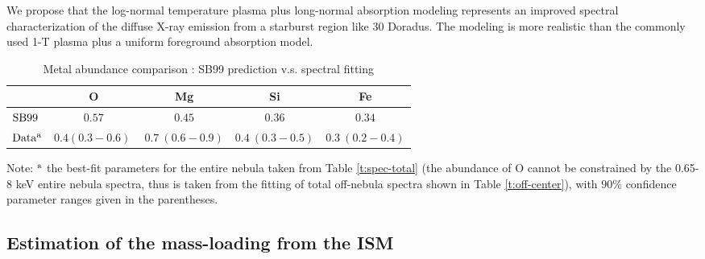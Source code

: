 \documentclass[usenatbib]{mnras}
\def\xs{30 Doradus}
\begin{document}
We propose that the log-normal temperature plasma plus long-normal absorption modeling represents an improved spectral characterization of the diffuse X-ray emission from a starburst region like \xs. The modeling is more realistic than the commonly used 1-T plasma plus a uniform foreground absorption model.

\begin{table*}%
\caption{Metal abundance comparison : SB99 prediction v.s. spectral fitting}
\begin{tabular}{lcccc}
\hline
 & O & Mg & Si & Fe \\
\hline
${\rm SB99}$ & $0.57$ & $0.45$ & $0.36$ & $0.34$\\

${\rm Data^{\rm a}}$ & $0.4(0.3-0.6)\ $ & $0.7\ (0.6-0.9)$ & $0.4\ (0.3-0.5)$ & $0.3\ (0.2-0.4)$\\
\hline
\end{tabular}
\label{t:abundance}

Note:  ${}^{\rm a}$ the best-fit parameters for the entire nebula taken from Table \ref{t:spec-total} (the abundance of O cannot be constrained by the 0.65-8 keV entire nebula spectra, thus is taken from the fitting of total off-nebula spectra shown in Table \ref{t:off-center}), with $90\%$ confidence parameter ranges given in the parentheses. 
\end{table*}

\subsection{Estimation of the mass-loading from the ISM}
\end{document}
